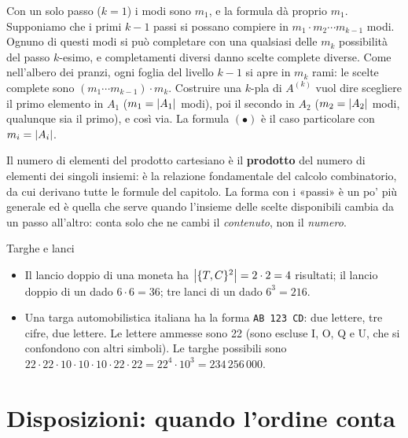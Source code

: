 \begin{dimostrazione}
 Con un solo passo ($k = 1$) i modi sono $m_1$, e la formula dà proprio $m_1$.
 Supponiamo che i primi $k - 1$ passi si possano compiere in $m_1 \cdot m_2 \cdots m_{k-1}$
modi.
 Ognuno di questi modi si può completare con una qualsiasi delle $m_k$ possibilità del passo
$k$-esimo, e completamenti diversi danno scelte complete diverse. Come nell'albero dei pranzi, ogni foglia del livello
$k-1$ si apre in $m_k$ rami: le scelte complete sono $(m_1 \cdots m_{k-1}) \cdot m_k$.
 Costruire una $k$-pla di $A^{(k)}$ vuol dire scegliere il primo elemento in $A_1$
($m_1 = \left\lvert A_1 \right\rvert$ modi), poi il secondo in $A_2$ ($m_2 = \left\lvert A_2 \right\rvert$ modi, qualunque sia il primo), e così via. La
formula $(\bullet)$ è il caso particolare con $m_i = \left\lvert A_i \right\rvert$.
\end{dimostrazione}

Il numero di elementi del prodotto cartesiano è il \textbf{prodotto} del numero di elementi dei singoli insiemi: è
la relazione fondamentale del calcolo combinatorio, da cui derivano tutte le formule del capitolo. La forma con i
«passi» è un po' più generale ed è quella che serve quando l'insieme delle scelte disponibili cambia da un passo
all'altro: conta solo che ne cambi il \emph{contenuto}, non il \emph{numero}.

\begin{esempio}{Targhe e lanci}
\begin{itemize}
  \item Il lancio doppio di una moneta ha $\left\lvert \{T,C\}^2 \right\rvert = 2 \cdot 2 = 4$ risultati; il lancio doppio di un dado
        $6 \cdot 6 = 36$; tre lanci di un dado $6^3 = 216$.
  \item Una targa automobilistica italiana ha la forma \texttt{AB 123 CD}: due lettere, tre cifre, due lettere. Le
        lettere ammesse sono 22 (sono escluse I, O, Q e U, che si confondono con altri simboli). Le targhe possibili
        sono $22 \cdot 22 \cdot 10 \cdot 10 \cdot 10 \cdot 22 \cdot 22 = 22^4 \cdot 10^3 = 234\,256\,000$.
\end{itemize}
\end{esempio}

\section{Disposizioni: quando l'ordine conta}

